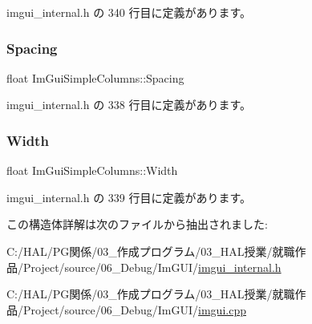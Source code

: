  imgui\+\_\+internal.\+h の 340 行目に定義があります。

\mbox{\label{struct_im_gui_simple_columns_aee2a43067de182ca1aa1447c8b658935}} 
\subsubsection{\texorpdfstring{Spacing}{Spacing}}
{\footnotesize\ttfamily float Im\+Gui\+Simple\+Columns\+::\+Spacing}



 imgui\+\_\+internal.\+h の 338 行目に定義があります。

\mbox{\label{struct_im_gui_simple_columns_a3b7ed6f3aa04e3ead1ea17e4d9f92767}} 
\subsubsection{\texorpdfstring{Width}{Width}}
{\footnotesize\ttfamily float Im\+Gui\+Simple\+Columns\+::\+Width}



 imgui\+\_\+internal.\+h の 339 行目に定義があります。



この構造体詳解は次のファイルから抽出されました\+:\begin{DoxyCompactItemize}
\item 
C\+:/\+H\+A\+L/\+P\+G関係/03\+\_\+作成プログラム/03\+\_\+\+H\+A\+L授業/就職作品/\+Project/source/06\+\_\+\+Debug/\+Im\+G\+U\+I/\mbox{\hyperlink{imgui__internal_8h}{imgui\+\_\+internal.\+h}}\item 
C\+:/\+H\+A\+L/\+P\+G関係/03\+\_\+作成プログラム/03\+\_\+\+H\+A\+L授業/就職作品/\+Project/source/06\+\_\+\+Debug/\+Im\+G\+U\+I/\mbox{\hyperlink{imgui_8cpp}{imgui.\+cpp}}\end{DoxyCompactItemize}
